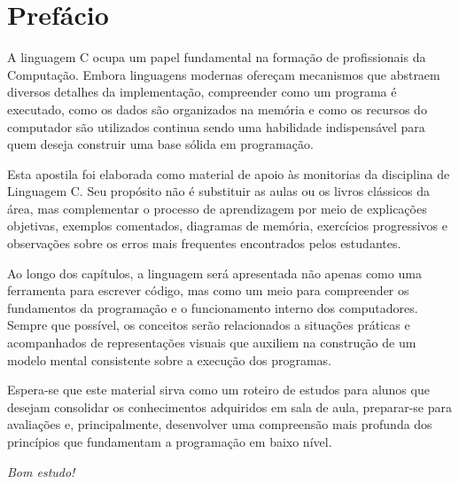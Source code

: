 \chapter*{Prefácio}

A linguagem C ocupa um papel fundamental na formação de profissionais da Computação. Embora linguagens modernas ofereçam mecanismos que abstraem diversos detalhes da implementação, compreender como um programa é executado, como os dados são organizados na memória e como os recursos do computador são utilizados continua sendo uma habilidade indispensável para quem deseja construir uma base sólida em programação.

Esta apostila foi elaborada como material de apoio às monitorias da disciplina de Linguagem C. Seu propósito não é substituir as aulas ou os livros clássicos da área, mas complementar o processo de aprendizagem por meio de explicações objetivas, exemplos comentados, diagramas de memória, exercícios progressivos e observações sobre os erros mais frequentes encontrados pelos estudantes.

Ao longo dos capítulos, a linguagem será apresentada não apenas como uma ferramenta para escrever código, mas como um meio para compreender os fundamentos da programação e o funcionamento interno dos computadores. Sempre que possível, os conceitos serão relacionados a situações práticas e acompanhados de representações visuais que auxiliem na construção de um modelo mental consistente sobre a execução dos programas.

Espera-se que este material sirva como um roteiro de estudos para alunos que desejam consolidar os conhecimentos adquiridos em sala de aula, preparar-se para avaliações e, principalmente, desenvolver uma compreensão mais profunda dos princípios que fundamentam a programação em baixo nível.

\vspace{1cm}

\begin{flushright}
\textit{Bom estudo!}
\end{flushright}
